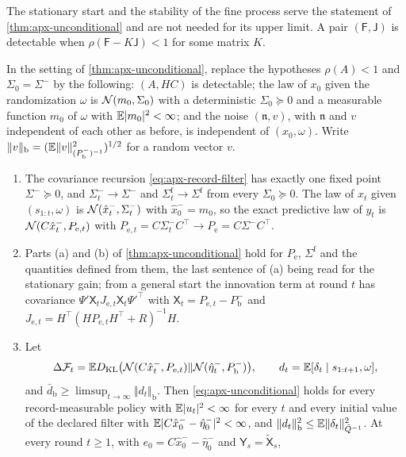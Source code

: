 The stationary start and the stability of the fine process serve the statement of \cref{thm:apx-unconditional} and are not needed for its upper limit. A pair $(\mathsf F,\mathsf J)$ is detectable when $\rho(\mathsf F-K\mathsf J)<1$ for some matrix $K$.

\begin{proposition}\label{prop:apx-start}
In the setting of \cref{thm:apx-unconditional}, replace the hypotheses $\rho(A)<1$ and $\Sigma_0=\Sigma^-$ by the following: $(A,HC)$ is detectable; the law of $x_0$ given the randomization $\omega$ is $\mathcal{N}(m_0,\Sigma_0)$ with a deterministic $\Sigma_0\succeq0$ and a measurable function $m_0$ of $\omega$ with $\mathbb{E}\lvert m_0\rvert^2<\infty$; and the noise $(\mathfrak n,v)$, with $\mathfrak n$ and $v$ independent of each other as before, is independent of $(x_0,\omega)$. Write $\Vert v\Vert_{\mathrm b}=(\mathbb{E}\Vert v\Vert^2_{(P^-_{\mathrm b})^{-1}})^{1/2}$ for a random vector $v$.
\begin{enumerate}
\item[(a)] The covariance recursion \eqref{eq:apx-record-filter} has exactly one fixed point $\Sigma^-\succeq0$, and $\Sigma^-_t\to\Sigma^-$ and $\Sigma^{\mathrm f}_t\to\Sigma^{\mathrm f}$ from every $\Sigma_0\succeq0$. The law of $x_t$ given $(s_{1:t},\omega)$ is $\mathcal{N}(\hat x^-_t,\Sigma^-_t)$ with $\hat x^-_0=m_0$, so the exact predictive law of $y_t$ is $\mathcal{N}(C\hat x^-_t,P_{\mathrm e,t})$ with $P_{\mathrm e,t}=C\Sigma^-_tC^\top\to P_{\mathrm e}=C\Sigma^-C^\top$.
\item[(b)] Parts (a) and (b) of \cref{thm:apx-unconditional} hold for $P_{\mathrm e}$, $\Sigma^{\mathrm f}$ and the quantities defined from them, the last sentence of (a) being read for the stationary gain; from a general start the innovation term at round $t$ has covariance $\Psi'\mathsf X_tJ_{\mathrm e,t}\mathsf X_t\Psi'^\top$ with $\mathsf X_t=P_{\mathrm e,t}-P^-_{\mathrm b}$ and $J_{\mathrm e,t}=H^\top(HP_{\mathrm e,t}H^\top+R)^{-1}H$.
\item[(c)] Let
\begin{equation*}
\Delta\mathcal F_t=\mathbb{E}D_{\mathrm{KL}}\bigl(\mathcal{N}(C\hat x^-_t,P_{\mathrm e,t})\Vert\mathcal{N}(\hat\eta^-_t,P^-_{\mathrm b})\bigr),\qquad d_t=\mathbb{E}[\delta_t\mid s_{1:t+1},\omega],
\end{equation*}
and $\bar d_{\mathrm b}\ge\limsup_{t\to\infty}\Vert d_t\Vert_{\mathrm b}$. Then \eqref{eq:apx-unconditional} holds for every record-measurable policy with $\mathbb{E}\lvert u_t\rvert^2<\infty$ for every $t$ and every initial value of the declared filter with $\mathbb{E}\lvert C\hat x^-_0-\hat\eta^-_0\rvert^2<\infty$, and $\Vert d_t\Vert_{\mathrm b}^2\le\mathbb{E}\Vert\delta_t\Vert^2_{\bar Q^{-1}}$. At every round $t\ge1$, with $e_0=C\hat x^-_0-\hat\eta^-_0$ and $\mathsf Y_s=\tilde{\mathsf X}_s$,

\end{enumerate}
\end{proposition}
